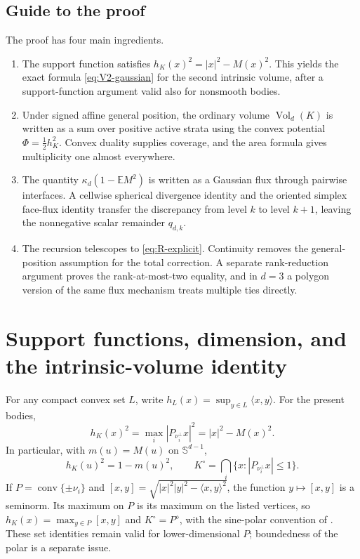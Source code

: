 \documentclass[10pt,reqno]{amsart}
\theoremstyle{definition}
\theoremstyle{remark}
\newcommand{\E}{\mathbb E}
\newcommand{\Sphere}{\mathbb S}
\newcommand{\conv}{\operatorname{conv}}
\newcommand{\Vol}{\operatorname{Vol}}
\newcommand{\ip}[2]{\langle #1,#2\rangle}
\begin{document}
\subsection*{Guide to the proof}
The proof has four main ingredients.
\begin{enumerate}[label=(\roman*)]
\item The support function satisfies $h_K(x)^2=|x|^2-M(x)^2$. This yields the exact formula \eqref{eq:V2-gaussian} for the second intrinsic volume, after a support-function argument valid also for nonsmooth bodies.
\item Under signed affine general position, the ordinary volume $\Vol_d(K)$ is written as a sum over positive active strata using the convex potential $\Phi=\tfrac12h_K^2$. Convex duality supplies coverage, and the area formula gives multiplicity one almost everywhere.
\item The quantity $\kappa_d(1-\E M^2)$ is written as a Gaussian flux through pairwise interfaces. A cellwise spherical divergence identity and the oriented simplex face-flux identity transfer the discrepancy from level $k$ to level $k+1$, leaving the nonnegative scalar remainder $q_{d,k}$.
\item The recursion telescopes to \eqref{eq:R-explicit}. Continuity removes the general-position assumption for the total correction. A separate rank-reduction argument proves the rank-at-most-two equality, and in $d=3$ a polygon version of the same flux mechanism treats multiple ties directly.
\end{enumerate}

\section{Support functions, dimension, and the intrinsic-volume identity}\label{sec:prelim}
For any compact convex set $L$, write $h_L(x)=\sup_{y\in L}\ip{x}{y}$. For the present bodies,
\begin{equation}\label{eq:support}
h_K(x)^2=\max_i|P_{\nu_i^\perp}x|^2=|x|^2-M(x)^2.
\end{equation}
In particular, with $m(u)=M(u)$ on $\Sphere^{d-1}$,
\begin{equation}\label{eq:h-m}
h_K(u)^2=1-m(u)^2,\qquad
K^\circ=\bigcap_i\{x:|P_{\nu_i^\perp}x|\le1\}.
\end{equation}
If $P=\conv\{\pm\nu_i\}$ and $[x,y]=\sqrt{|x|^2|y|^2-\ip{x}{y}^2}$, the function $y\mapsto[x,y]$ is a seminorm. Its maximum on $P$ is its maximum on the listed vertices, so
$h_K(x)=\max_{y\in P}[x,y]$ and $K^\circ=P^\diamond$, with the sine-polar convention of \cite{HuangLiXiYe}. These set identities remain valid for lower-dimensional $P$; boundedness of the polar is a separate issue.
\end{document}
